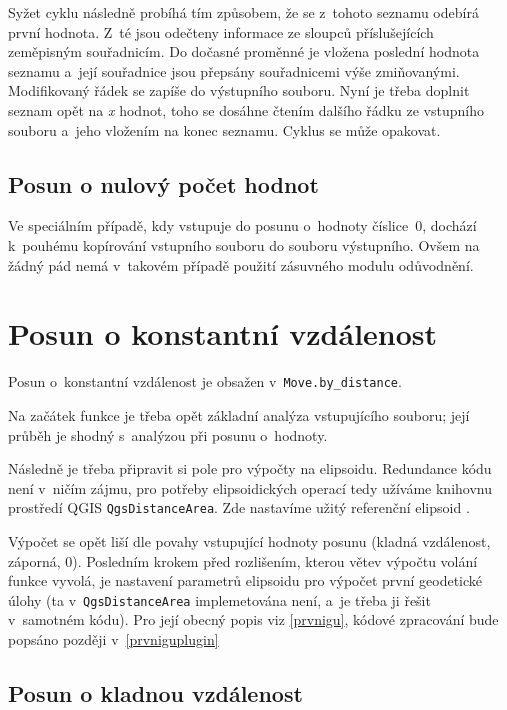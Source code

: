 Syžet cyklu následně probíhá
tím způsobem, že se z~tohoto seznamu odebírá první hodnota. Z~té jsou odečteny informace ze
sloupců příslušejících zeměpisným souřadnicím. Do dočasné proměnné je vložena poslední
hodnota seznamu a~její souřadnice jsou pře\-psány souřadnicemi výše zmiňovanými. Modifikovaný řádek
se zapíše do výstupního souboru. Nyní je třeba doplnit seznam opět na \textit{x} hodnot, toho
se dosáhne čtením dalšího řádku ze vstupního souboru a~jeho vložením na konec seznamu. Cyklus
se může opakovat. 

\subsection{Posun o nulový počet hodnot}
\label{nulovehodnoty}

Ve speciálním případě, kdy vstupuje do posunu o~hodnoty číslice~0,
dochází k~pouhé\-mu kopírování vstupního
souboru do souboru výstupního. Ovšem na žádný pád nemá v~takovém případě použití zásuvného modulu
odůvodnění. 

\section{Posun o konstantní vzdálenost}
\label{by_distance}

Posun o~konstantní vzdálenost je obsažen v~{\tt Move.by\_distance}. 

Na začátek funkce je třeba opět základní analýza vstupujícího souboru; její průběh je shodný
s~analýzou při posunu o~hodnoty. 

Následně je třeba připravit si pole pro výpočty na elipsoidu. Redundance kódu není v~ničím
zájmu, pro potřeby elipsoidických operací tedy užíváme knihovnu
prostředí QGIS {\tt QgsDistanceArea}. Zde nastavíme
užitý referenční elipsoid . 

Výpočet se opět liší dle povahy vstupující hodnoty posunu (kladná vzdálenost,
záporná, 0). Posledním krokem před rozlišením, kterou větev výpočtu volání funkce vyvolá, je nastavení
parametrů elipsoidu pro výpočet první geodetické úlohy (ta v~{\tt QgsDistanceArea} implemetována
není, a~je třeba ji řešit v~samotném kódu). Pro její obecný popis viz
\ref{prvnigu}, kódové zpracování bude popsáno později v~\ref{prvniguplugin} 

\subsection{Posun o kladnou vzdálenost}
\label{kladnavzdalenost}

